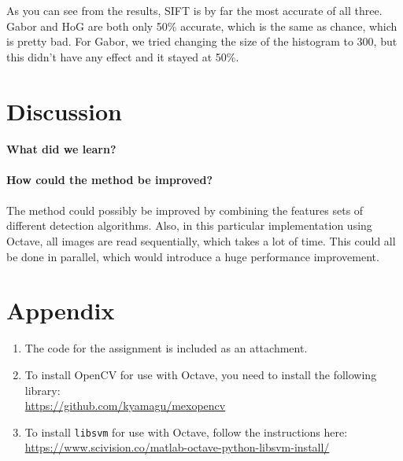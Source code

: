 \documentclass{article}
\begin{document}
  As you can see from the results, SIFT is by far the most accurate of all three. Gabor and HoG are both only 50\% accurate, which is the same as chance, which is pretty bad. For Gabor, we tried changing the size of the histogram to 300, but this didn't have any effect and it stayed at 50\%.

  \newpage

  \section{Discussion}

  \textbf{What did we learn?}\\
  \\
  \textbf{How could the method be improved?}\\
  \\
  The method could possibly be improved by combining the features sets of different detection algorithms. Also, in this particular implementation using Octave, all images are read sequentially, which takes a lot of time. This could all be done in parallel, which would introduce a huge performance improvement.

  \newpage

  \section{Appendix}

  \begin{enumerate}
    \item The code for the assignment is included as an attachment.
    \item To install OpenCV for use with Octave, you need to install the following library:\\
          \url{https://github.com/kyamagu/mexopencv}
    \item To install \texttt{libsvm} for use with Octave, follow the instructions here:\\
          \url{https://www.scivision.co/matlab-octave-python-libsvm-install/}
  \end{enumerate}
\end{document}
